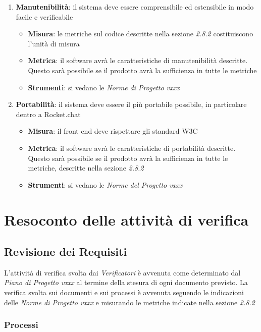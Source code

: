 {\begin{enumerate}
  \item \textbf{Manutenibilità}: il sistema deve essere comprensibile ed estensibile in modo facile e verificabile
  \begin{itemize}
    \item \textbf{Misura}: le metriche sul codice descritte nella sezione \emph{2.8.2}
    costituiscono l'unità di misura
    \item \textbf{Metrica}: il software avrà le caratteristiche di manutenibilità descritte. Questo sarà possibile se il prodotto avrà la sufficienza in tutte le metriche
    \item \textbf{Strumenti}: si vedano le  \emph{Norme di Progetto vxxx} 
  \end{itemize}
  
  \item \textbf{Portabilità}: il sistema deve essere il più portabile possibile, in particolare dentro a Rocket.chat
  \begin{itemize}
    \item \textbf{Misura}: il front end deve rispettare gli standard W3C
    \item \textbf{Metrica}: il software avrà le caratteristiche di
    portabilità descritte. Questo sarà possibile se il prodotto
    avrà la sufficienza in tutte le metriche, descritte nella sezione \emph{2.8.2}
    \item \textbf{Strumenti}: si vedano le \emph{Norme del Progetto vxxx}
  \end{itemize}
\end{enumerate}




\section{Resoconto delle attività di verifica}

\subsection{Revisione dei Requisiti}

L’attività di verifica svolta dai  \emph{Verificatori}  è avvenuta come determinato dal \emph{Piano di Progetto
vxxx} al termine della stesura di ogni documento previsto. La verifica svolta sui documenti e
sui processi è avvenuta seguendo le indicazioni delle  \emph{Norme di Progetto vxxx}  e misurando le
metriche indicate nella sezione \emph{2.8.2}

\subsubsection{Processi}

}
